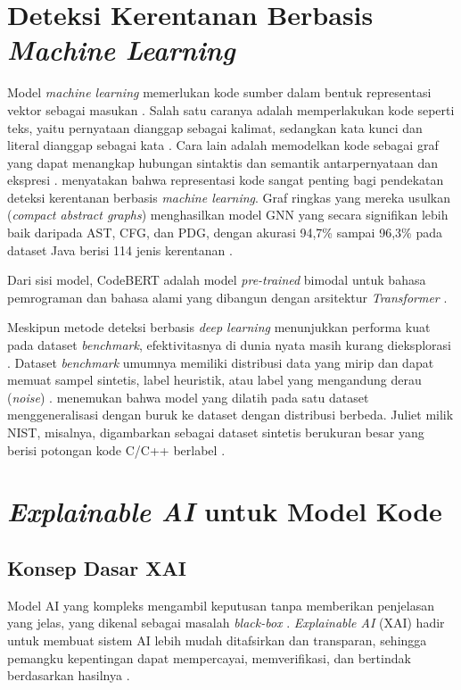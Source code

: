 \section{Deteksi Kerentanan Berbasis \textit{Machine Learning}}
\label{sec:deteksi-ml}
Model \textit{machine learning} memerlukan kode sumber dalam bentuk representasi vektor sebagai masukan \autocite{ganz2023}.
Salah satu caranya adalah memperlakukan kode seperti teks,
yaitu pernyataan dianggap sebagai kalimat, sedangkan kata kunci dan literal dianggap sebagai kata \autocite{ganz2023}.
Cara lain adalah memodelkan kode sebagai graf yang dapat menangkap hubungan sintaktis dan semantik antarpernyataan dan ekspresi \autocite{ganz2023}.
\textcite{luo2022} menyatakan bahwa representasi kode sangat penting bagi pendekatan deteksi kerentanan berbasis \textit{machine learning}.
Graf ringkas yang mereka usulkan (\textit{compact abstract graphs}) menghasilkan model GNN yang secara signifikan lebih baik daripada AST, CFG, dan PDG,
dengan akurasi 94,7\% sampai 96,3\% pada dataset Java berisi 114 jenis kerentanan \autocite{luo2022}.

Dari sisi model, CodeBERT adalah model \textit{pre-trained} bimodal untuk bahasa pemrograman dan bahasa alami
yang dibangun dengan arsitektur \textit{Transformer} \autocite{feng2020}.

Meskipun metode deteksi berbasis \textit{deep learning} menunjukkan performa kuat pada dataset \textit{benchmark},
efektivitasnya di dunia nyata masih kurang dieksplorasi \autocite{lu2025}.
Dataset \textit{benchmark} umumnya memiliki distribusi data yang mirip dan dapat memuat sampel sintetis, label heuristik, atau label yang mengandung derau (\textit{noise}) \autocite{lu2025}.
\textcite{lu2025} menemukan bahwa model yang dilatih pada satu dataset menggeneralisasi dengan buruk ke dataset dengan distribusi berbeda.
Juliet milik NIST, misalnya, digambarkan sebagai dataset sintetis berukuran besar yang berisi potongan kode C/C++ berlabel \autocite{lu2025}.

\section{\textit{Explainable AI} untuk Model Kode}
\label{sec:xai}

\subsection{Konsep Dasar XAI}
\label{sec:konsep-xai-token}
Model AI yang kompleks mengambil keputusan tanpa memberikan penjelasan yang jelas,
yang dikenal sebagai masalah \textit{black-box} \autocite{arora2025}.
\textit{Explainable AI} (XAI) hadir untuk membuat sistem AI lebih mudah ditafsirkan dan transparan,
sehingga pemangku kepentingan dapat mempercayai, memverifikasi, dan bertindak berdasarkan hasilnya \autocite{arora2025}.


